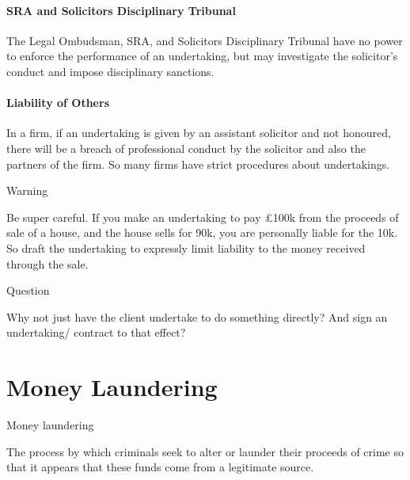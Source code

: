 \documentclass[
]{article}
\newenvironment{env-0cb2e3ab-3bde-42f2-97ad-ac1eecea3f6d}
{
    \savenotes\tcolorbox[blanker,breakable,left=5pt,borderline west={2pt}{-4pt}{orange}]
}
{
    \endtcolorbox\spewnotes
}
\newenvironment{env-86a00e9b-0e00-4fe8-86cd-090a54119c0f}
{
    \savenotes\tcolorbox[blanker,breakable,left=5pt,borderline west={2pt}{-4pt}{gold}]
}
{
    \endtcolorbox\spewnotes
}
\newenvironment{env-131bf3d9-4263-4e79-8eed-44c374685e2a}
{
    \savenotes\tcolorbox[blanker,breakable,left=5pt,borderline west={2pt}{-4pt}{gray}]
}
{
    \endtcolorbox\spewnotes
}
\begin{document}
\hypertarget{sra-and-solicitors-disciplinary-tribunal}{%
\paragraph{SRA and Solicitors Disciplinary
Tribunal}\label{sra-and-solicitors-disciplinary-tribunal}}

The Legal Ombudsman, SRA, and Solicitors Disciplinary Tribunal have no
power to enforce the performance of an undertaking, but may investigate
the solicitor's conduct and impose disciplinary sanctions.

\hypertarget{liability-of-others}{%
\paragraph{Liability of Others}\label{liability-of-others}}

In a firm, if an undertaking is given by an assistant solicitor and not
honoured, there will be a breach of professional conduct by the
solicitor and also the partners of the firm. So many firms have strict
procedures about undertakings.

\begin{env-0cb2e3ab-3bde-42f2-97ad-ac1eecea3f6d}

Warning

Be super careful. If you make an undertaking to pay £100k from the
proceeds of sale of a house, and the house sells for 90k, you are
personally liable for the 10k. So draft the undertaking to expressly
limit liability to the money received through the sale.

\end{env-0cb2e3ab-3bde-42f2-97ad-ac1eecea3f6d}

\begin{env-131bf3d9-4263-4e79-8eed-44c374685e2a}

Question

Why not just have the client undertake to do something directly? And
sign an undertaking/ contract to that effect?

\end{env-131bf3d9-4263-4e79-8eed-44c374685e2a}

\hypertarget{money-laundering}{%
\section{Money Laundering}\label{money-laundering}}

\begin{env-86a00e9b-0e00-4fe8-86cd-090a54119c0f}

Money laundering

The process by which criminals seek to alter or launder their proceeds
of crime so that it appears that these funds come from a legitimate
source.

\end{env-86a00e9b-0e00-4fe8-86cd-090a54119c0f}
\end{document}
